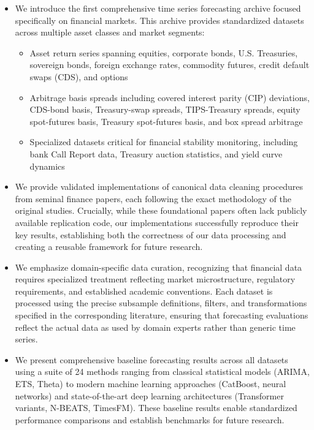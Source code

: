 \documentclass{article}
\begin{document}
\begin{itemize}
    \item We introduce the first comprehensive time series forecasting archive focused specifically on financial markets. This archive provides standardized datasets across multiple asset classes and market segments:
    \begin{itemize}
        \item Asset return series spanning equities, corporate bonds, U.S. Treasuries, sovereign bonds, foreign exchange rates, commodity futures, credit default swaps (CDS), and options
        \item Arbitrage basis spreads including covered interest parity (CIP) deviations, CDS-bond basis, Treasury-swap spreads, TIPS-Treasury spreads, equity spot-futures basis, Treasury spot-futures basis, and box spread arbitrage
        \item Specialized datasets critical for financial stability monitoring, including bank Call Report data, Treasury auction statistics, and yield curve dynamics
    \end{itemize}
    
    \item We provide validated implementations of canonical data cleaning procedures from seminal finance papers, each following the exact methodology of the original studies. Crucially, while these foundational papers often lack publicly available replication code, our implementations successfully reproduce their key results, establishing both the correctness of our data processing and creating a reusable framework for future research.
    
    \item We emphasize domain-specific data curation, recognizing that financial data requires specialized treatment reflecting market microstructure, regulatory requirements, and established academic conventions. Each dataset is processed using the precise subsample definitions, filters, and transformations specified in the corresponding literature, ensuring that forecasting evaluations reflect the actual data as used by domain experts rather than generic time series.
    
    \item We present comprehensive baseline forecasting results across all datasets using a suite of 24 methods ranging from classical statistical models (ARIMA, ETS, Theta) to modern machine learning approaches (CatBoost, neural networks) and state-of-the-art deep learning architectures (Transformer variants, N-BEATS, TimesFM). These baseline results enable standardized performance comparisons and establish benchmarks for future research.
    

\end{itemize}
\end{document}
